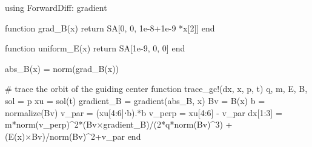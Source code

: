\documentclass[
  a4paper,
  DIV=11]{scrreprt}
\newenvironment{Shaded}{\begin{snugshade}}{\end{snugshade}}
\newcommand{\BuiltInTok}[1]{\textcolor[rgb]{0.00,0.23,0.31}{#1}}
\newcommand{\CommentTok}[1]{\textcolor[rgb]{0.37,0.37,0.37}{#1}}
\newcommand{\ControlFlowTok}[1]{\textcolor[rgb]{0.00,0.23,0.31}{#1}}
\newcommand{\FloatTok}[1]{\textcolor[rgb]{0.68,0.00,0.00}{#1}}
\newcommand{\FunctionTok}[1]{\textcolor[rgb]{0.28,0.35,0.67}{#1}}
\newcommand{\ImportTok}[1]{\textcolor[rgb]{0.00,0.46,0.62}{#1}}
\newcommand{\KeywordTok}[1]{\textcolor[rgb]{0.00,0.23,0.31}{#1}}
\newcommand{\NormalTok}[1]{\textcolor[rgb]{0.00,0.23,0.31}{#1}}
\newcommand{\OperatorTok}[1]{\textcolor[rgb]{0.37,0.37,0.37}{#1}}
\begin{document}
\begin{Shaded}
\begin{Highlighting}[]
\ImportTok{using} \BuiltInTok{ForwardDiff}\NormalTok{: gradient}

\KeywordTok{function} \FunctionTok{grad\_B}\NormalTok{(x)}
    \ControlFlowTok{return}\NormalTok{ SA[}\FloatTok{0}\NormalTok{, }\FloatTok{0}\NormalTok{, }\FloatTok{1e{-}8}\OperatorTok{+}\FloatTok{1e{-}9} \OperatorTok{*}\NormalTok{x[}\FloatTok{2}\NormalTok{]]}
\KeywordTok{end}

\KeywordTok{function} \FunctionTok{uniform\_E}\NormalTok{(x)}
    \ControlFlowTok{return}\NormalTok{ SA[}\FloatTok{1e{-}9}\NormalTok{, }\FloatTok{0}\NormalTok{, }\FloatTok{0}\NormalTok{]}
\KeywordTok{end}

\FunctionTok{abs\_B}\NormalTok{(x) }\OperatorTok{=} \FunctionTok{norm}\NormalTok{(}\FunctionTok{grad\_B}\NormalTok{(x))}

\CommentTok{\# trace the orbit of the guiding center}
\KeywordTok{function} \FunctionTok{trace\_gc!}\NormalTok{(dx, x, p, t)}
\NormalTok{    q, m, E, B, sol }\OperatorTok{=}\NormalTok{ p}
\NormalTok{    xu }\OperatorTok{=} \FunctionTok{sol}\NormalTok{(t)}
\NormalTok{    gradient\_B }\OperatorTok{=} \FunctionTok{gradient}\NormalTok{(abs\_B, x)}
\NormalTok{    Bv }\OperatorTok{=} \FunctionTok{B}\NormalTok{(x)}
\NormalTok{    b }\OperatorTok{=} \FunctionTok{normalize}\NormalTok{(Bv)}
\NormalTok{    v\_par }\OperatorTok{=}\NormalTok{ (xu[}\FloatTok{4}\OperatorTok{:}\FloatTok{6}\NormalTok{]}\OperatorTok{⋅}\NormalTok{b)}\OperatorTok{.*}\NormalTok{b}
\NormalTok{    v\_perp }\OperatorTok{=}\NormalTok{ xu[}\FloatTok{4}\OperatorTok{:}\FloatTok{6}\NormalTok{] }\OperatorTok{{-}}\NormalTok{ v\_par}
\NormalTok{    dx[}\FloatTok{1}\OperatorTok{:}\FloatTok{3}\NormalTok{] }\OperatorTok{=} \FunctionTok{m*norm}\NormalTok{(v\_perp)}\OperatorTok{\^{}}\FloatTok{2}\FunctionTok{*}\NormalTok{(Bv}\OperatorTok{×}\NormalTok{gradient\_B)}\OperatorTok{/}\NormalTok{(}\FloatTok{2}\FunctionTok{*q*norm}\NormalTok{(Bv)}\OperatorTok{\^{}}\FloatTok{3}\NormalTok{) }\OperatorTok{+}\NormalTok{ (}\FunctionTok{E}\NormalTok{(x)}\OperatorTok{×}\NormalTok{Bv)}\OperatorTok{/}\FunctionTok{norm}\NormalTok{(Bv)}\OperatorTok{\^{}}\FloatTok{2}\OperatorTok{+}\NormalTok{v\_par}
\KeywordTok{end}


\end{Highlighting}
\end{Shaded}
\end{document}
